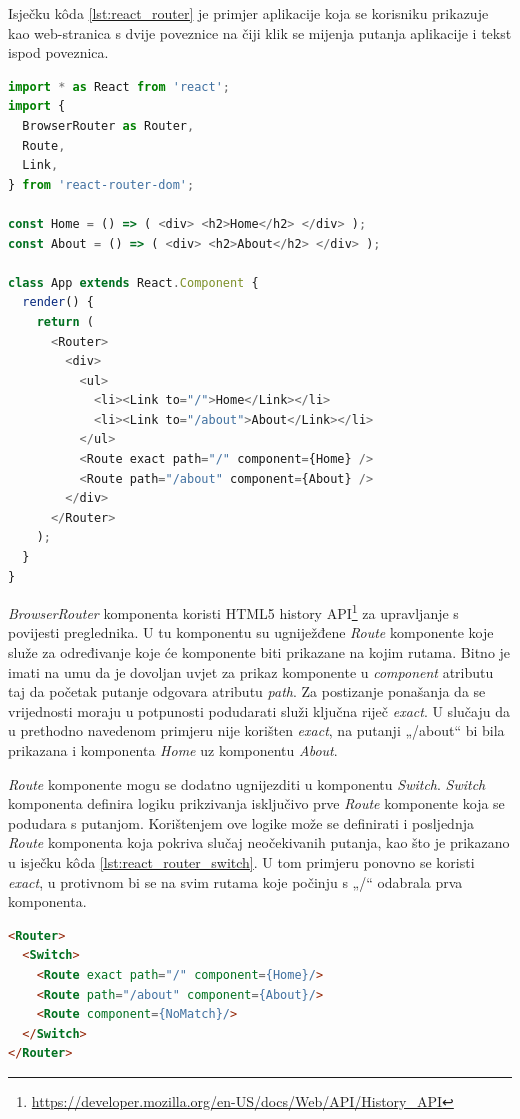 \documentclass[times, utf8, diplomski, numeric]{fer}
\newcommand{\razmakp}{\vspace{18pt}}
\newcommand{\razmaks}{\vspace{10pt}}
\begin{document}
\razmakp

Isječku kôda \ref{lst:react_router} je primjer aplikacije koja se korisniku prikazuje kao web-stranica s dvije poveznice na čiji klik se mijenja putanja aplikacije i tekst ispod poveznica.

\newpage %
\begin{lstlisting}[language=JavaScript, caption={Primjer korištenja React Router biblioteke}, label={lst:react_router}]
import * as React from 'react';
import {
  BrowserRouter as Router,
  Route,
  Link,
} from 'react-router-dom';

const Home = () => ( <div> <h2>Home</h2> </div> );
const About = () => ( <div> <h2>About</h2> </div> );

class App extends React.Component {
  render() {
    return (
      <Router>
        <div>
          <ul>
            <li><Link to="/">Home</Link></li>
            <li><Link to="/about">About</Link></li>
          </ul>
          <Route exact path="/" component={Home} />
          <Route path="/about" component={About} />
        </div>
      </Router>
    );
  }
}
\end{lstlisting}
\razmaks

\emph{BrowserRouter} komponenta koristi HTML5 history API\footnote{\url{https://developer.mozilla.org/en-US/docs/Web/API/History_API}} za upravljanje s povijesti preglednika.
U tu komponentu su ugniježđene \emph{Route} komponente koje služe za određivanje koje će komponente biti prikazane na kojim rutama.
Bitno je imati na umu da je dovoljan uvjet za prikaz komponente u \emph{component} atributu taj da početak putanje odgovara atributu \emph{path}.
Za postizanje ponašanja da se vrijednosti moraju u potpunosti podudarati služi ključna riječ \emph{exact}.
U slučaju da u prethodno navedenom primjeru nije korišten \emph{exact}, na putanji „/about“ bi bila prikazana i komponenta \emph{Home} uz komponentu \emph{About}.

\emph{Route} komponente mogu se dodatno ugnijezditi u komponentu \emph{Switch}.
\emph{Switch} komponenta definira logiku prikzivanja isključivo prve \emph{Route} komponente koja se podudara s putanjom.
Korištenjem ove logike može se definirati i posljednja \emph{Route} komponenta koja pokriva slučaj neočekivanih putanja, kao što je prikazano u isječku kôda \ref{lst:react_router_switch}.
U tom primjeru ponovno se koristi \emph{exact}, u protivnom bi se na svim rutama koje počinju s „/“ odabrala prva komponenta.

\razmakp %
\begin{lstlisting}[language=html, caption={Primjer korištenja \emph{Switch}komponente}, label={lst:react_router_switch}]
<Router>
  <Switch>
    <Route exact path="/" component={Home}/>
    <Route path="/about" component={About}/>
    <Route component={NoMatch}/>
  </Switch>
</Router>
\end{lstlisting}
\razmaks
\end{document}
